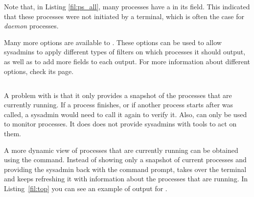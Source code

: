 
Note that, in Listing \ref{fil:ps_all}, many processes have a  in its  field. This indicated that these processes were not initiated by a terminal, which is often the case for \textit{daemon} processes.

Many more options are available to . These options can be used to allow sysadmins to apply different types of filters on which processes it should output, as well as to add more fields to each output. For more information about different  options, check its  page.


\subsection{}

A problem with  is that it only provides a snapshot of the processes that are currently running. If a process finishes, or if another process starts after  was called, a sysadmin would need to call it again to verify it. Also,  can only be used to monitor processes. It does does not provide sysadmins with tools to act on them.

A more dynamic view of processes that are currently running can be obtained using the  command. Instead of showing only a snapshot of current processes and providing the sysadmin back with the command prompt,  takes over the terminal and keeps refreshing it with information about the processes that are running. In Listing~\ref{fil:top} you can see an example of output for .

